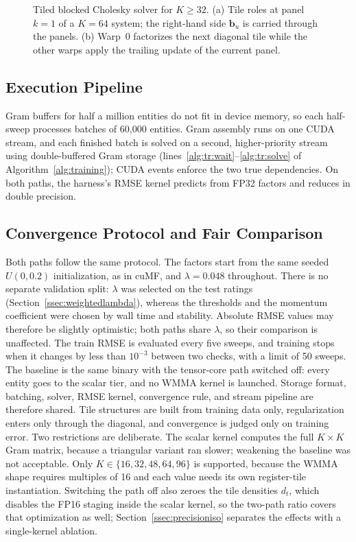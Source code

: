 \begin{figure}[!t]
\centering

\caption{Tiled blocked Cholesky solver for $K \ge 32$. (a) Tile roles at panel $k{=}1$ of a $K{=}64$ system; the right-hand side $\mathbf{b}_u$ is carried through the panels. (b) Warp~0 factorizes the next diagonal tile while the other warps apply the trailing update of the current panel.}
\label{fig:cholesky}
\end{figure}

\subsection{Execution Pipeline}
\label{ssec:pipeline}

Gram buffers for half a million entities do not fit in device memory, so each half-sweep processes batches of 60{,}000 entities. Gram assembly runs on one CUDA stream, and each finished batch is solved on a second, higher-priority stream using double-buffered Gram storage (lines~\ref{alg:tr:wait}--\ref{alg:tr:solve} of Algorithm~\ref{alg:training}); CUDA events enforce the two true dependencies. On both paths, the harness's RMSE kernel predicts from FP32 factors and reduces in double precision.

\subsection{Convergence Protocol and Fair Comparison}
\label{ssec:protocol}

Both paths follow the same protocol. The factors start from the same seeded $U(0, 0.2)$ initialization, as in cuMF, and $\lambda = 0.048$ throughout. There is no separate validation split: $\lambda$ was selected on the test ratings (Section~\ref{ssec:weightedlambda}), whereas the thresholds and the momentum coefficient were chosen by wall time and stability. Absolute RMSE values may therefore be slightly optimistic; both paths share $\lambda$, so their comparison is unaffected. The train RMSE is evaluated every five sweeps, and training stops when it changes by less than $10^{-3}$ between two checks, with a limit of 50 sweeps.
The baseline is the same binary with the tensor-core path switched off: every entity goes to the scalar tier, and no WMMA kernel is launched. Storage format, batching, solver, RMSE kernel, convergence rule, and stream pipeline are therefore shared. Tile structures are built from training data only, regularization enters only through the diagonal, and convergence is judged only on training error. Two restrictions are deliberate. The scalar kernel computes the full $K \times K$ Gram matrix, because a triangular variant ran slower; weakening the baseline was not acceptable. Only $K \in \{16, 32, 48, 64, 96\}$ is supported, because the WMMA shape requires multiples of 16 and each value needs its own register-tile instantiation. Switching the path off also zeroes the tile densities $d_t$, which disables the FP16 staging inside the scalar kernel, so the two-path ratio covers that optimization as well; Section~\ref{ssec:precisioniso} separates the effects with a single-kernel ablation.
